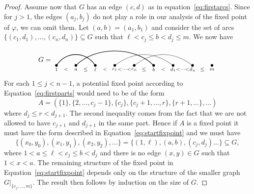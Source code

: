 \documentclass[ALCO,ThmDefs,Unicode,epreuves]{cedram}
\begin{document}
\begin{proof}
Assume now that $G$ has an edge $(c,d)$ as in equation~\eqref{eq:firstarcs}. Since for $j>1$, the edges $(a_j,b_j)$ do not play a role 
in our analysis of the fixed point of $\varphi$, we can omit them. Let $(a,b)=(a_1,b_1)$ and consider the set of arcs $\big\{(c_1,d_1),\ldots,(c_n,d_n)\big\}\subseteq G$ such that $\ell<c_j\le b<d_j\le m$. We now have
\begin{equation}\label{eq:nextarcs}
G=
\begin{tikzpicture}[baseline=.2cm]
	\foreach \x in {1,3,5,7,9,11,13,15,17} 
		\node (\x) at (\x/2,0) [inner sep=-1pt] {$\bullet$};
	\node at (1/2,-.2) {$\scriptstyle 1$};
	\node at (2/2,-.2) {$\scriptstyle <$};	
	\node at (3/2,-.2) {$\scriptstyle a$};
	\node at (4/2,-.2) {$\scriptstyle \le$};	
	\node at (5/2,-.2) {$\scriptstyle \ell$};
	\node at (6/2,-.2) {$\scriptstyle <$};	
	\node at (7/2,-.2) {$\scriptstyle c_1$};
	\node at (8/2,-.2) {$\scriptstyle <\cdots <$};	
	\node at (9/2,-.2) {$\scriptstyle c_n$};
	\node at (10/2,-.2) {$\scriptstyle \le$};	
	\node at (11/2,-.2) {$\scriptstyle b$};
	\node at (12/2,-.2) {$\scriptstyle <$};	
	\node at (13/2,-.2) {$\scriptstyle d_1$};
	\node at (14/2,-.2) {$\scriptstyle <\cdots <$};	
	\node at (15/2,-.2) {$\scriptstyle d_n$};
	\node at (16/2,-.2) {$\scriptstyle \le$};	
	\node at (17/2,-.2) {$\scriptstyle m$};
	\draw [thick] (1) .. controls (2/2,.75) and (4/2,.75) .. (5); 
	\draw [thick] (3) .. controls (5/2,1) and (9/2,1) .. (11); 
	\draw [densely dotted,thick] (7) .. controls (9/2,.75) and (11/2,.75) .. (13); 
	\draw [densely dotted,thick] (9) .. controls (11/2,.75) and (13/2,.75) .. (15); 
\end{tikzpicture} 
 \end{equation}
For each $1\le j<n-1$, a potential fixed point according to Equation~\eqref{eq:firstparts} would need to be of the form
\begin{equation}\label{eq:startfixpoint}
 A=(\{1\},\{2,\ldots,c_{j}-1\},\{c_{j}\},\{c_{j}+1,\ldots,r\},\{r+1,\ldots\},\ldots)
 \end{equation}
 where $d_j\le r<d_{j+1}$. The second inequality comes from the fact that we are not allowed to have $c_{j+1}$ and $d_{j+1}$ in the same part.
Hence if $A$ is a fixed point it must have the form described in Equation~\eqref{eq:startfixpoint} and we must have
 $$\big\{(x_0,y_0),(x_1,y_1),(x_2,y_2),\ldots\big\}=\big\{(1,\ell),(a,b),(c_j,d_j)\ldots\big\}\subseteq G,$$
where $ 1<a \le\ell <c_j \le b <d_j$ and there is no edge $(x,y)\in G$ such that $1<x<a$. The remaining structure of the fixed point in Equation~\eqref{eq:startfixpoint}
depends only on the structure of the smaller graph $G|_{\{c_j,\ldots,m\}}$. The result then follows by induction on the size of $G$.
\end{proof}
\end{document}
